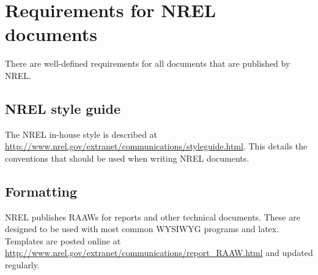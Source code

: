 \section{Requirements for NREL documents}
There are well-defined requirements for all documents that are published by NREL. 

\subsection{NREL style guide}
The NREL in-house style is described at \href{http://www.nrel.gov/extranet/communications/styleguide.html}{http://www.nrel.gov/extranet/communications/styleguide.html}. This details the conventions that should be used when writing NREL documents.

\subsection{Formatting}
NREL publishes RAAWs for reports and other technical documents. These are designed to be used with most common WYSIWYG programs and latex. Templates are posted online at \href{http://www.nrel.gov/extranet/communications/report_RAAW.html}{http://www.nrel.gov/extranet/communications/report\_RAAW.html} and updated regularly. 
